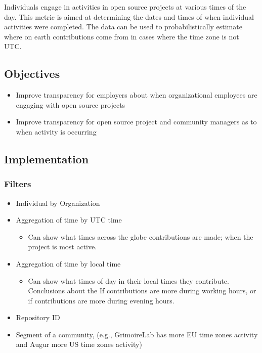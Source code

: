 \documentclass[
  12pt,
]{article}
\providecommand{\tightlist}{%
  \setlength{\itemsep}{0pt}\setlength{\parskip}{0pt}}
\begin{document}
Individuals engage in activities in open source projects at various
times of the day. This metric is aimed at determining the dates and
times of when individual activities were completed. The data can be used
to probabilistically estimate where on earth contributions come from in
cases where the time zone is not UTC.

\hypertarget{objectives-2}{%
\subsection{Objectives}\label{objectives-2}}

\begin{itemize}
\tightlist
\item
  Improve transparency for employers about when organizational employees
  are engaging with open source projects
\item
  Improve transparency for open source project and community managers as
  to when activity is occurring
\end{itemize}

\hypertarget{implementation-2}{%
\subsection{Implementation}\label{implementation-2}}

\hypertarget{filters-1}{%
\subsubsection{Filters}\label{filters-1}}

\begin{itemize}
\tightlist
\item
  Individual by Organization
\item
  Aggregation of time by UTC time

  \begin{itemize}
  \tightlist
  \item
    Can show what times across the globe contributions are made; when
    the project is most active.
  \end{itemize}
\item
  Aggregation of time by local time

  \begin{itemize}
  \tightlist
  \item
    Can show what times of day in their local times they contribute.
    Conclusions about the If contributions are more during working
    hours, or if contributions are more during evening hours.
  \end{itemize}
\item
  Repository ID
\item
  Segment of a community, (e.g., GrimoireLab has more EU time zones
  activity and Augur more US time zones activity)
\end{itemize}
\end{document}
